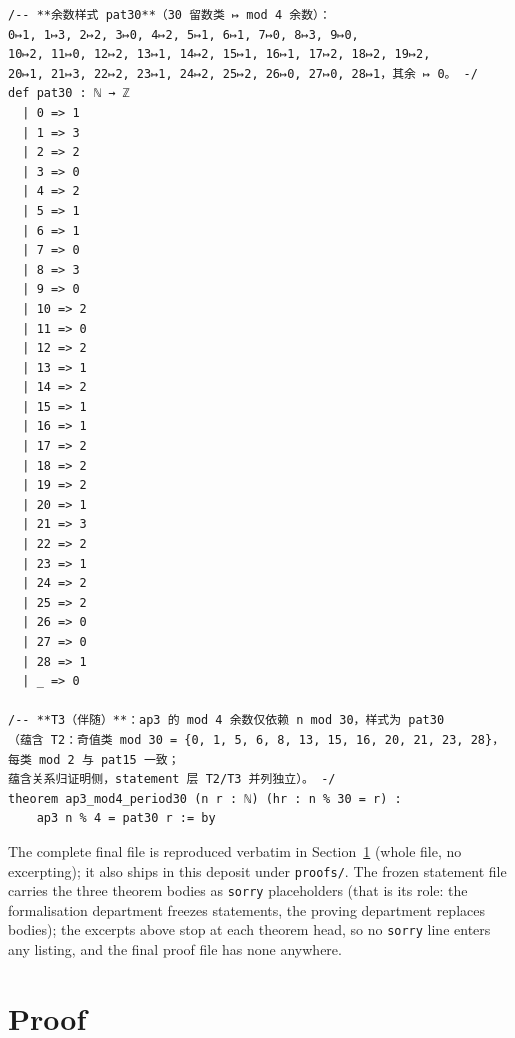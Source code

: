 \documentclass[11pt]{article}
\begin{document}
\begin{lstlisting}[caption={Frozen definition of \texttt{pat30} and the head
of Theorem~\ref{thm:mod4}, verbatim lines 119--159 of the frozen statement
file.},label={lst:s3}]
/-- **余数样式 pat30**（30 留数类 ↦ mod 4 余数）：
0↦1, 1↦3, 2↦2, 3↦0, 4↦2, 5↦1, 6↦1, 7↦0, 8↦3, 9↦0,
10↦2, 11↦0, 12↦2, 13↦1, 14↦2, 15↦1, 16↦1, 17↦2, 18↦2, 19↦2,
20↦1, 21↦3, 22↦2, 23↦1, 24↦2, 25↦2, 26↦0, 27↦0, 28↦1，其余 ↦ 0。 -/
def pat30 : ℕ → ℤ
  | 0 => 1
  | 1 => 3
  | 2 => 2
  | 3 => 0
  | 4 => 2
  | 5 => 1
  | 6 => 1
  | 7 => 0
  | 8 => 3
  | 9 => 0
  | 10 => 2
  | 11 => 0
  | 12 => 2
  | 13 => 1
  | 14 => 2
  | 15 => 1
  | 16 => 1
  | 17 => 2
  | 18 => 2
  | 19 => 2
  | 20 => 1
  | 21 => 3
  | 22 => 2
  | 23 => 1
  | 24 => 2
  | 25 => 2
  | 26 => 0
  | 27 => 0
  | 28 => 1
  | _ => 0

/-- **T3（伴随）**：ap3 的 mod 4 余数仅依赖 n mod 30，样式为 pat30
（蕴含 T2：奇值类 mod 30 = {0, 1, 5, 6, 8, 13, 15, 16, 20, 21, 23, 28}，每类 mod 2 与 pat15 一致；
蕴含关系归证明侧，statement 层 T2/T3 并列独立）。 -/
theorem ap3_mod4_period30 (n r : ℕ) (hr : n % 30 = r) :
    ap3 n % 4 = pat30 r := by
\end{lstlisting}

The complete final file is reproduced verbatim in Section~\ref{sec:proof}
(whole file, no excerpting); it also ships in this deposit under
\texttt{proofs/}. The frozen statement file carries the three theorem
bodies as \texttt{sorry} placeholders (that is its role: the formalisation
department freezes statements, the proving department replaces bodies); the
excerpts above stop at each theorem head, so no \texttt{sorry} line enters
any listing, and the final proof file has none anywhere.

\section{Proof}\label{sec:proof}
\end{document}
